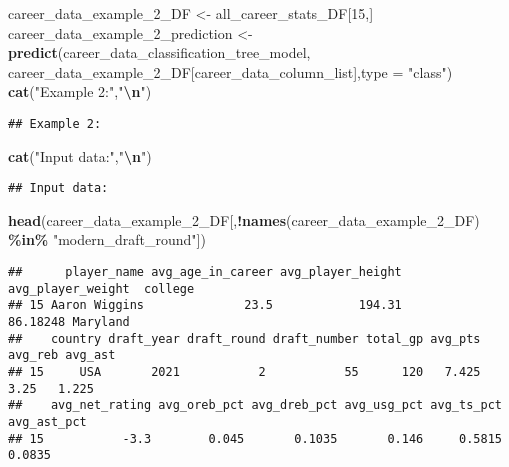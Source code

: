 \documentclass[
]{article}
\newenvironment{Shaded}{\begin{snugshade}}{\end{snugshade}}
\newcommand{\AttributeTok}[1]{\textcolor[rgb]{0.13,0.29,0.53}{#1}}
\newcommand{\DecValTok}[1]{\textcolor[rgb]{0.00,0.00,0.81}{#1}}
\newcommand{\FunctionTok}[1]{\textcolor[rgb]{0.13,0.29,0.53}{\textbf{#1}}}
\newcommand{\NormalTok}[1]{#1}
\newcommand{\OtherTok}[1]{\textcolor[rgb]{0.56,0.35,0.01}{#1}}
\newcommand{\SpecialCharTok}[1]{\textcolor[rgb]{0.81,0.36,0.00}{\textbf{#1}}}
\newcommand{\StringTok}[1]{\textcolor[rgb]{0.31,0.60,0.02}{#1}}
\begin{document}
\begin{Shaded}
\begin{Highlighting}[]
\NormalTok{career\_data\_example\_2\_DF }\OtherTok{\textless{}{-}}\NormalTok{ all\_career\_stats\_DF[}\DecValTok{15}\NormalTok{,]}
\NormalTok{career\_data\_example\_2\_prediction }\OtherTok{\textless{}{-}} \FunctionTok{predict}\NormalTok{(career\_data\_classification\_tree\_model,}
\NormalTok{                career\_data\_example\_2\_DF[career\_data\_column\_list],}\AttributeTok{type =} \StringTok{"class"}\NormalTok{)}
\FunctionTok{cat}\NormalTok{(}\StringTok{"Example 2:"}\NormalTok{,}\StringTok{"}\SpecialCharTok{\textbackslash{}n}\StringTok{"}\NormalTok{)}
\end{Highlighting}
\end{Shaded}

\begin{verbatim}
## Example 2:
\end{verbatim}

\begin{Shaded}
\begin{Highlighting}[]
\FunctionTok{cat}\NormalTok{(}\StringTok{"Input data:"}\NormalTok{,}\StringTok{"}\SpecialCharTok{\textbackslash{}n}\StringTok{"}\NormalTok{)}
\end{Highlighting}
\end{Shaded}

\begin{verbatim}
## Input data:
\end{verbatim}

\begin{Shaded}
\begin{Highlighting}[]
\FunctionTok{head}\NormalTok{(career\_data\_example\_2\_DF[,}\SpecialCharTok{!}\FunctionTok{names}\NormalTok{(career\_data\_example\_2\_DF) }\SpecialCharTok{\%in\%} \StringTok{"modern\_draft\_round"}\NormalTok{])}
\end{Highlighting}
\end{Shaded}

\begin{verbatim}
##      player_name avg_age_in_career avg_player_height avg_player_weight  college
## 15 Aaron Wiggins              23.5            194.31          86.18248 Maryland
##    country draft_year draft_round draft_number total_gp avg_pts avg_reb avg_ast
## 15     USA       2021           2           55      120   7.425    3.25   1.225
##    avg_net_rating avg_oreb_pct avg_dreb_pct avg_usg_pct avg_ts_pct avg_ast_pct
## 15           -3.3        0.045       0.1035       0.146     0.5815      0.0835
\end{verbatim}
\end{document}
